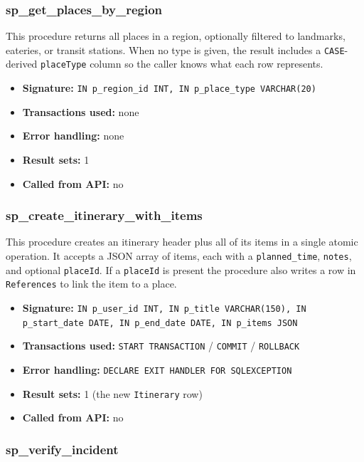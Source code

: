\subsubsection{sp\_get\_places\_by\_region}

This procedure returns all places in a region, optionally filtered to landmarks, eateries, or transit stations. When no type is given, the result includes a \texttt{CASE}-derived \texttt{placeType} column so the caller knows what each row represents.

\begin{itemize}
    \item \textbf{Signature:} \texttt{IN p\_region\_id INT, IN p\_place\_type VARCHAR(20)}
    \item \textbf{Transactions used:} none
    \item \textbf{Error handling:} none
    \item \textbf{Result sets:} 1
    \item \textbf{Called from API:} no
\end{itemize}

\subsubsection{sp\_create\_itinerary\_with\_items}

This procedure creates an itinerary header plus all of its items in a single atomic operation. It accepts a JSON array of items, each with a \texttt{planned\_time}, \texttt{notes}, and optional \texttt{placeId}. If a \texttt{placeId} is present the procedure also writes a row in \texttt{References} to link the item to a place.

\begin{itemize}
    \item \textbf{Signature:} \texttt{IN p\_user\_id INT, IN p\_title VARCHAR(150), IN p\_start\_date DATE, IN p\_end\_date DATE, IN p\_items JSON}
    \item \textbf{Transactions used:} \texttt{START TRANSACTION} / \texttt{COMMIT} / \texttt{ROLLBACK}
    \item \textbf{Error handling:} \texttt{DECLARE EXIT HANDLER FOR SQLEXCEPTION}
    \item \textbf{Result sets:} 1 (the new \texttt{Itinerary} row)
    \item \textbf{Called from API:} no
\end{itemize}

\subsubsection{sp\_verify\_incident}

